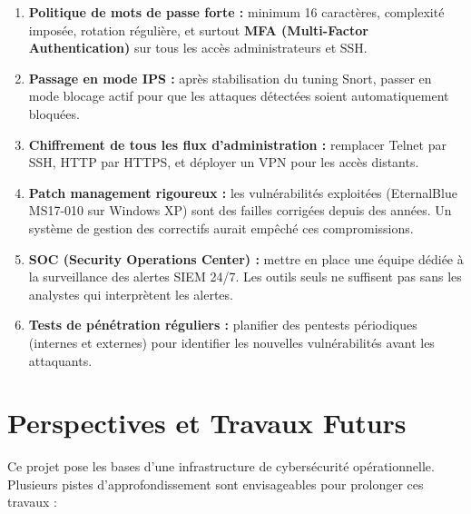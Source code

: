 \documentclass[12pt,a4paper,openany]{report}
\begin{document}
\begin{tcolorbox}[colback=primary!5!white, colframe=primary, title=\textbf{Recommandations Prioritaires}]
\begin{enumerate}
    \item \textbf{Politique de mots de passe forte :} minimum 16 caractères, complexité imposée,
          rotation régulière, et surtout \textbf{MFA (Multi-Factor Authentication)} sur tous les
          accès administrateurs et SSH.

    \item \textbf{Passage en mode IPS :} après stabilisation du tuning Snort, passer en mode
          blocage actif pour que les attaques détectées soient automatiquement bloquées.

    \item \textbf{Chiffrement de tous les flux d'administration :} remplacer Telnet par SSH,
          HTTP par HTTPS, et déployer un VPN pour les accès distants.

    \item \textbf{Patch management rigoureux :} les vulnérabilités exploitées (EternalBlue MS17-010
          sur Windows XP) sont des failles corrigées depuis des années. Un système de gestion des
          correctifs aurait empêché ces compromissions.

    \item \textbf{SOC (Security Operations Center) :} mettre en place une équipe dédiée à la
          surveillance des alertes SIEM 24/7. Les outils seuls ne suffisent pas sans les analystes
          qui interprètent les alertes.

    \item \textbf{Tests de pénétration réguliers :} planifier des pentests périodiques (internes
          et externes) pour identifier les nouvelles vulnérabilités avant les attaquants.
\end{enumerate}
\end{tcolorbox}

\section*{Perspectives et Travaux Futurs}

Ce projet pose les bases d'une infrastructure de cybersécurité opérationnelle. Plusieurs pistes
d'approfondissement sont envisageables pour prolonger ces travaux :
\end{document}
